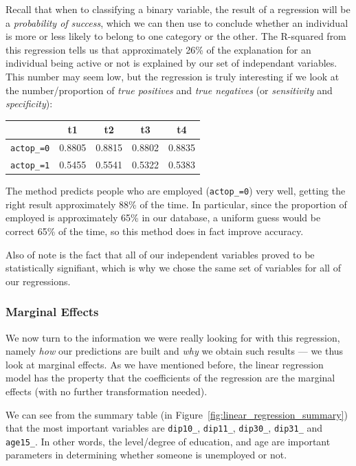 Recall that when to classifying a binary variable, the result of a regression will be a \textit{probability of success}, which we can then use to conclude whether an individual is more or less likely to belong to one category or the other. The R-squared from this regression tells us that approximately 26\% of the explanation for an individual being active or not is explained by our set of independant variables. This number may seem low, but the regression is truly interesting if we look at the number/proportion of \textit{true positives} and \textit{true negatives} (or \textit{sensitivity} and \textit{specificity}):

\begin{center}
    \begin{tabular}{lcccc}
        \hline
                           & t1     & t2     & t3     & t4     \\
        \hline
        \texttt{actop\_=0} & 0.8805 & 0.8815 & 0.8802 & 0.8835 \\
        \texttt{actop\_=1} & 0.5455 & 0.5541 & 0.5322 & 0.5383 \\
    \end{tabular}
\end{center}

The method predicts people who are employed (\texttt{actop\_=0}) very well, getting the right result approximately 88\% of the time. In particular, since the proportion of employed is approximately 65\% in our database, a uniform guess would be correct 65\% of the time, so this method does in fact improve accuracy.

Also of note is the fact that all of our independent variables proved to be statistically signifiant, which is why we chose the same set of variables for all of our regressions.

\subsubsection{Marginal Effects}
We now turn to the information we were really looking for with this regression, namely \textit{how} our predictions are built and \textit{why} we obtain such results --- we thus look at marginal effects. As we have mentioned before, the linear regression model has the property that the coefficients of the regression are the marginal effects (with no further transformation needed).

We can see from the summary table (in Figure~\ref{fig:linear_regression_summary}) that the most important variables are \texttt{dip10\_}, \texttt{dip11\_}, \texttt{dip30\_}, \texttt{dip31\_} and \texttt{age15\_}. In other words, the level/degree of education, and age are important parameters in determining whether someone is unemployed or not.

